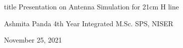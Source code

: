 \documentclass[12pt]{beamer}
\begin{document}
\begin{frame}
    \vspace{\fill}
    \begin{beamercolorbox}[sep=8pt, center,shadow=true, rounded=true]{title}
        Presentation on \linebreak
        Antenna Simulation for 21cm H line
    \end{beamercolorbox}
    \begin{center}
      \footnotesize{
        Ashmita Panda  \linebreak
        4th Year Integrated M.Sc.\linebreak
        SPS, NISER \linebreak

        November 25, 2021 \linebreak
      }
    \end{center}
\end{frame}
\end{document}
